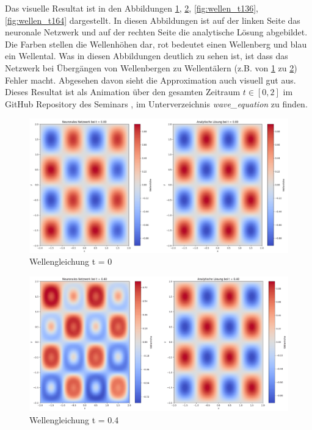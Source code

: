 Das visuelle Resultat ist in den Abbildungen \ref{fig:wellen_t0}, \ref{fig:wellen_t04}, \ref{fig:wellen_t136}, \ref{fig:wellen_t164} dargestellt.
In diesen Abbildungen ist auf der linken Seite das neuronale Netzwerk und auf der rechten Seite die analytische Lösung abgebildet.
Die Farben stellen die Wellenhöhen dar, rot bedeutet einen Wellenberg und blau ein Wellental.
Was in diesen Abbildungen deutlich zu sehen ist, ist dass das Netzwerk bei Übergängen von Wellenbergen zu Wellentälern (z.B. von \ref{fig:wellen_t0} zu \ref{fig:wellen_t04}) Fehler macht.
Abgesehen davon sieht die Approximation auch visuell gut aus.
Dieses Resultat ist als Animation über den gesamten Zeitraum $t \in [0, 2]$ im GitHub Repository des Seminars \cite{neuronal:github_source_code}, im Unterverzeichnis \emph{wave\_equation} zu finden.
\begin{figure}
    \centering
    \includegraphics[width=\textwidth]{papers/neuronal/images/prediction_wave_t0.png}
    \caption{Wellengleichung t = 0}
    \label{fig:wellen_t0}
\end{figure}
\begin{figure}
    \centering
    \includegraphics[width=\textwidth]{papers/neuronal/images/prediction_wave_t04.png}
    \caption{Wellengleichung t = 0.4}
    \label{fig:wellen_t04}
\end{figure}
